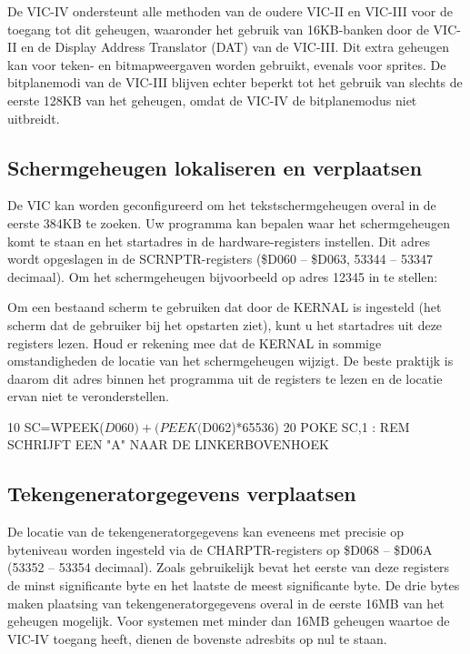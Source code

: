 De VIC-IV ondersteunt alle methoden van de oudere VIC-II en VIC-III voor de toegang tot dit geheugen, waaronder het gebruik van 16KB-banken door de VIC-II en de Display Address Translator (DAT) van de VIC-III. Dit extra geheugen kan voor teken- en bitmapweergaven worden gebruikt, evenals voor sprites. De bitplanemodi van de VIC-III blijven echter beperkt tot het gebruik van slechts de eerste 128KB van het geheugen, omdat de VIC-IV de bitplanemodus niet uitbreidt.

\subsection{Schermgeheugen lokaliseren en verplaatsen}

De VIC kan worden geconfigureerd om het tekstschermgeheugen overal in de eerste 384KB te zoeken. Uw programma kan bepalen waar het schermgeheugen komt te staan en het startadres in de hardware-registers instellen. Dit adres wordt opgeslagen in de SCRNPTR-registers (\$D060 -- \$D063, 53344 -- 53347 decimaal). Om het schermgeheugen bijvoorbeeld op adres 12345 in te stellen:


Om een bestaand scherm te gebruiken dat door de KERNAL is ingesteld (het scherm dat de gebruiker bij het opstarten ziet), kunt u het startadres uit deze registers lezen. Houd er rekening mee dat de KERNAL in sommige omstandigheden de locatie van het schermgeheugen wijzigt. De beste praktijk is daarom dit adres binnen het programma uit de registers te lezen en de locatie ervan niet te veronderstellen.

\begin{screencode}
10 SC=WPEEK($D060)+(PEEK($D062)*65536)
20 POKE SC,1 : REM SCHRIJFT EEN "A" NAAR DE LINKERBOVENHOEK
\end{screencode}

\subsection{Tekengeneratorgegevens verplaatsen}

De locatie van de tekengeneratorgegevens kan eveneens met precisie op byteniveau worden ingesteld via de CHARPTR-registers op \$D068 -- \$D06A (53352 -- 53354 decimaal). Zoals gebruikelijk bevat het eerste van deze registers de minst significante byte en het laatste de meest significante byte. De drie bytes maken plaatsing van tekengeneratorgegevens overal in de eerste 16MB van het geheugen mogelijk. Voor systemen met minder dan 16MB geheugen waartoe de VIC-IV toegang heeft, dienen de bovenste adresbits op nul te staan.

